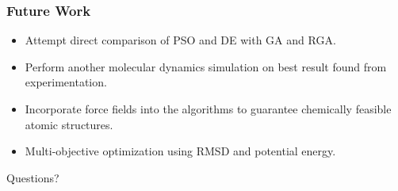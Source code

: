 \documentclass[10pt]{beamer}
\begin{document}


\begin{frame}
	\frametitle{Future Work}

	\begin{itemize}
		\item Attempt direct comparison of PSO and DE with GA and RGA.
		\item Perform another molecular dynamics simulation on best result found from experimentation.
		\item Incorporate force fields into the algorithms to guarantee chemically feasible atomic structures.
		\item Multi-objective optimization using RMSD and potential energy.
	\end{itemize}
\end{frame}

\begin{frame}
	
	\begin{center}
	\Huge Questions?
	\end{center}

\end{frame}
\end{document}
